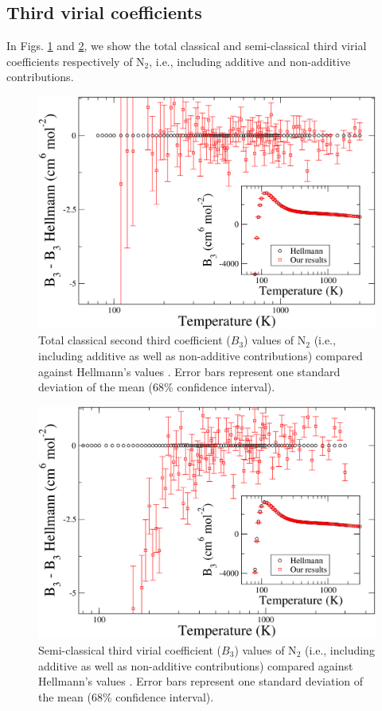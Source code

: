     \subsection{Third virial coefficients}
        In Figs. \ref{fig:B3CLN2} and \ref{fig:B3SCN2}, we show the total classical and semi-classical third virial coefficients respectively of N$_2$, i.e., including additive and non-additive contributions.
        \begin{figure}[!htbp]
            \centering
            \includegraphics[scale=0.20,keepaspectratio]{Chapter-5/Figures/B3CLFull9sResultsAll.png}
            \caption{Total classical second third coefficient ($B_3$) values of N$_2$ (i.e., including additive as well as non-additive contributions) compared against Hellmann's values \cite{Hellmann2013}. Error bars represent one standard deviation of the mean (68\% confidence interval).}
            \label{fig:B3CLN2}
        \end{figure}

        \begin{figure}[!htbp]
            \centering
            \includegraphics[scale=0.20,keepaspectratio]{Chapter-5/Figures/B3SCFull8sResultsAll.png}
            \caption{Semi-classical third virial coefficient ($B_3$) values of N$_2$ (i.e., including additive as well as non-additive contributions) compared against Hellmann's values \cite{Hellmann2013}. Error bars represent one standard deviation of the mean (68\% confidence interval).}
            \label{fig:B3SCN2}
        \end{figure}

